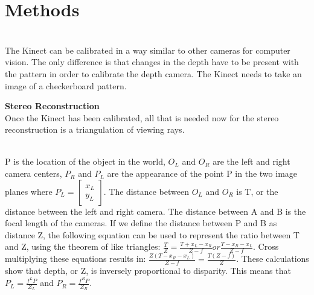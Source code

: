 \documentclass[12pt,twocolumn]{article}
\begin{document}
\section{Methods}
\\
The Kinect can be calibrated in a way similar to other cameras for computer vision. The only difference is that changes in the depth have to be present  with the pattern in order to calibrate the depth camera. The Kinect needs to take an image of a checkerboard pattern.

{ \bf Stereo Reconstruction}\\ 
Once the Kinect has been calibrated, all that is needed now for the stereo reconstruction is a triangulation of viewing rays. \\
 \\
\indent P is the location of the object in the world, $O_{L}$ and $O_{R}$ are the left and right camera centers, $P_{R}$ and $P_{L}$ are the appearance of the point P in the two image planes where $P_{L}= \begin{bmatrix}
x_{L} \\
y_{L} \end{bmatrix} $. The distance between $O_{L}$ and $O_{R}$ is T, or the distance between the left and right camera. The distance between A and B is the focal length of the cameras. If we define the distance between P and B as distance Z, the following equation  can be used to represent the ratio between T and Z, using the theorem of like triangles: 
$\frac{T}{Z}=\frac{T+x_{L}-x_{R}}{Z-f} or \frac{T-{x_{R}-x_{L}}}{Z-f} $.
Cross multiplying these equations results in: 
$\frac{Z(T-x_{R}-x_{L})}{Z-f} = \frac{T(Z-f)}{Z} $.
These calculations show that depth, or Z, is inversely proportional to disparity. This means that  $P_{L}= \frac{f^{L}P}{Z_{L}} $ and $P_{R}= \frac{f^{R}P}{Z_{R}}. $ \\ 
\end{document}
